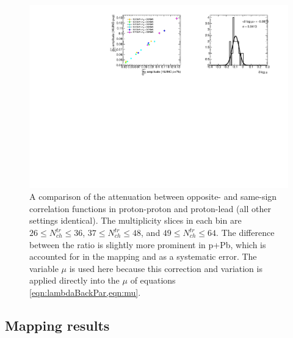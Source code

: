 \begin{figure}[t]
\begin{minipage}[t]{1.0\textwidth}
\centering
\includegraphics{mu_hijing_pp_pPb.pdf}
\end{minipage}
\caption{A comparison of the attenuation between opposite- and same-sign correlation functions in \Hijing proton-proton and \Hijing proton-lead (all other settings identical). The multiplicity slices in each \kt bin are $26 \leq N_{ch}^{tr} \leq 36$, $37 \leq N_{ch}^{tr} \leq 48$, and $49 \leq N_{ch}^{tr} \leq 64$. The difference between the ratio is slightly more prominent in p+Pb, which is accounted for in the mapping and as a systematic error. The variable $\mu$ is used here because this correction and variation is applied directly into the $\mu$ of equations \cref{eqn:lambdaBackPar,eqn:mu}.}
\label{fig:mu_hijing_pp_pPb}
\end{figure}

\FloatBarrier

\subsection{Mapping results}

